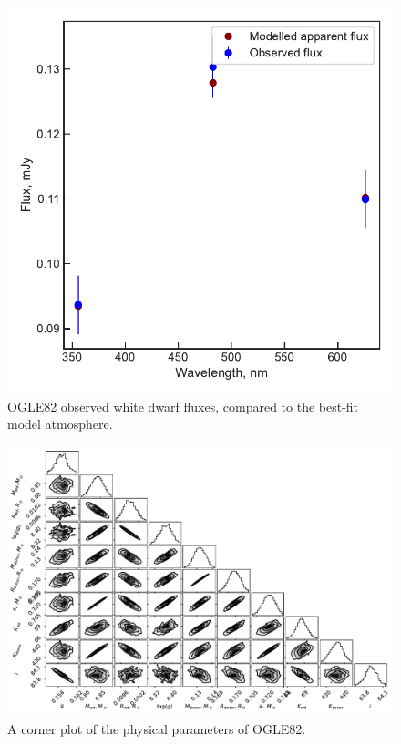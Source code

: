 \begin{figure}
    \centering
    \includegraphics[width=\textwidth]{figures/results/OGLE82/fluxplot.pdf}
    \caption{OGLE82 observed white dwarf fluxes, compared to the best-fit model atmosphere.}
    \label{fig:OGLE82 flux plot}
\end{figure}
\begin{figure}
    \includegraphics[height=\textwidth, angle=90]{figures/results/physicalparams_corners/OGLE82_physcorner.pdf}
    \caption{A corner plot of the physical parameters of OGLE82.}
\end{figure}
\clearpage




